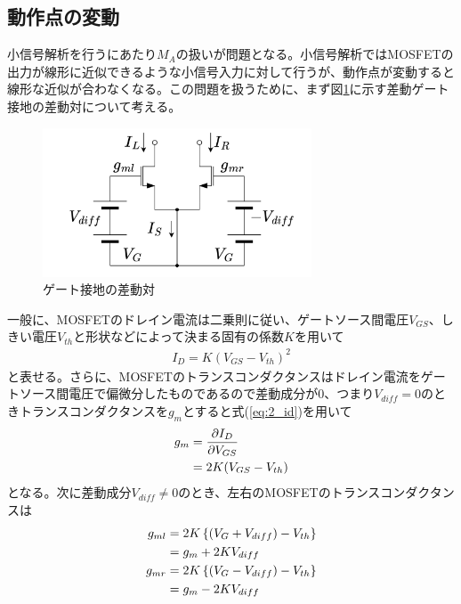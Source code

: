         \subsection{動作点の変動}   \label{ch:gilbert_valiable_gm}
            小信号解析を行うにあたり$M_{A}$の扱いが問題となる。小信号解析ではMOSFETの出力が線形に近似できるような小信号入力に対して行うが、動作点が変動すると線形な近似が合わなくなる。この問題を扱うために、まず図\ref{fig:2_OP}に示す差動ゲート接地の差動対について考える。\par
            \begin{figure}[b]
                \begin{center}
                    \includegraphics[width=80mm]{figures/chapter2/OperatingPoint.png}
                    \caption{ゲート接地の差動対}
                    \label{fig:2_OP}
                \end{center}
            \end{figure}
            一般に、MOSFETのドレイン電流は二乗則に従い、ゲートソース間電圧$V_{GS}$、しきい電圧$V_{th}$と形状などによって決まる固有の係数$K$を用いて
            \begin{align}
                I_{D}=K(V_{GS}-V_{th})^{2}  \label{eq:2_id}
            \end{align}
            と表せる。さらに、MOSFETのトランスコンダクタンスはドレイン電流をゲートソース間電圧で偏微分したものであるので差動成分が$0$、つまり$V_{diff}=0$のときトランスコンダクタンスを$g_{m}$とすると式(\ref{eq:2_id})を用いて
            \begin{align}
                g_{m}&=\frac{ \partial I_{D} }{ \partial V_{GS} }   \notag\\
                &=2K(V_{GS}-V_{th})     \label{eq:2_gm}
            \end{align}
            となる。次に差動成分$V_{diff}\neq0$のとき、左右のMOSFETのトランスコンダクタンスは
            \begin{align}
                g_{ml}&=2K\left\{ (V_{G}+V_{diff}) -V_{th} \right\}     \notag\\
                &=g_{m}+2KV_{diff}      \notag\\
                g_{mr}&=2K\left\{ (V_{G}-V_{diff}) -V_{th} \right\}     \notag\\
                &=g_{m}-2KV_{diff}      \notag
            \end{align}
